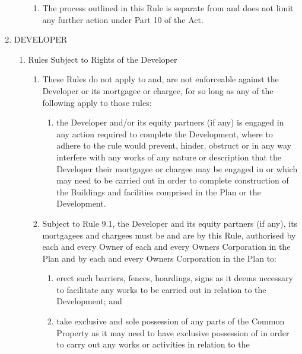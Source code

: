 \documentclass{article}
\begin{document}
\begin{enumerate}[label=\arabic*.]
\begin{enumerate}[label=\arabic{enumi}.\arabic*.]
\begin{enumerate}[label=(\arabic*)]
\item  The process outlined in this Rule is separate from and does not limit any further action under Part 10 of the Act.

\end{enumerate}

\end{enumerate}

\item  DEVELOPER

\begin{enumerate}[label=\arabic{enumi}.\arabic*.]

\item  Rules Subject to Rights of the Developer

\begin{enumerate}[label=(\arabic*)]

\item  These Rules do not apply to and, are not enforceable against the Developer or its mortgagee or chargee, for so long as any of the following apply to those rules:

\begin{enumerate}[label=(\alph*)]

\item  the Developer and/or its equity partners (if any) is engaged in any action required to complete the Development, where to adhere to the rule would prevent, hinder, obstruct or in any way interfere with any works of any nature or description that the Developer their mortgagee or chargee may be engaged in or which may need to be carried out in order to complete construction of the Buildings and facilities comprised in the Plan or the Development.

\end{enumerate}

\item  Subject to Rule 9.1, the Developer and its equity partners (if any), its mortgagees and chargees must be and are by this Rule, authorised by each and every Owner of each and every Owners Corporation in the Plan and by each and every Owners Corporation in the Plan to:

\begin{enumerate}[label=(\alph*)]

\item  erect such barriers, fences, hoardings, signs as it deems necessary to facilitate any works to be carried out in relation to the Development; and

\item  take exclusive and sole possession of any parts of the Common Property as it may need to have exclusive possession of in order to carry out any works or activities in relation to the
\newpage


\end{enumerate}
\end{enumerate}
\end{enumerate}
\end{enumerate}
\end{document}
